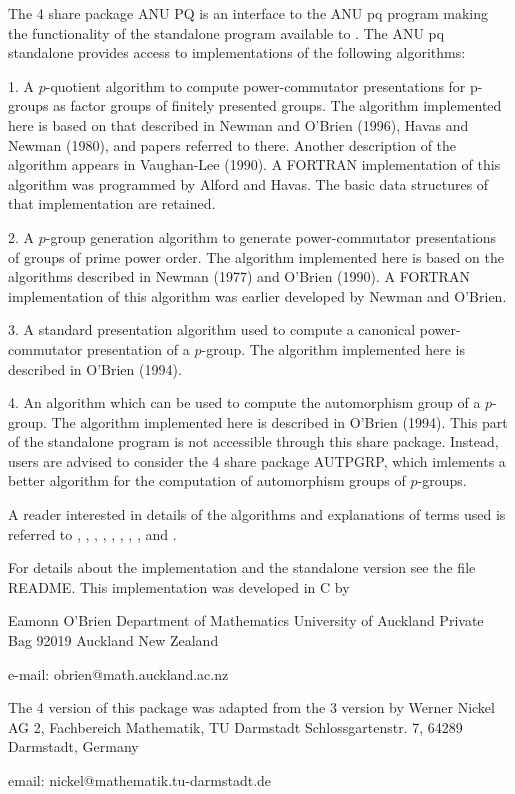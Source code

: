 
The {\GAP} 4 share  package ANU PQ is an interface to  the ANU pq program
making the  functionality of the standalone program  available to {\GAP}.
The ANU pq standalone provides access to implementations of the following
algorithms:

1.  A  $p$-quotient algorithm  to compute  power-commutator presentations
for  p-groups  as  factor  groups  of  finitely  presented  groups.   The
algorithm  implemented here  is based  on  that described  in Newman  and
O'Brien (1996),  Havas and Newman  (1980), and papers referred  to there.
Another description  of the algorithm  appears in Vaughan-Lee  (1990).  A
FORTRAN  implementation of this  algorithm was  programmed by  Alford and
Havas.  The basic data structures of that implementation are retained.

2. A   $p$-group  generation   algorithm  to   generate  power-commutator
presentations of groups of  prime power order.  The algorithm implemented
here is  based on the algorithms  described in Newman  (1977) and O'Brien
(1990).  A FORTRAN implementation of this algorithm was earlier developed
by Newman and O'Brien.

3.   A  standard presentation   algorithm  used  to compute  a  canonical
power-commutator presentation  of a $p$-group. The  algorithm implemented
here is described in O'Brien (1994).

4. An algorithm which can be used  to compute the automorphism group of a
$p$-group. The algorithm implemented here is described in O'Brien (1994).
This part of the standalone  program is not accessible through this share
package.   Instead, users  are advised  to  consider the  {\GAP} 4  share
package AUTPGRP,  which imlements a better algorithm  for the computation
of automorphism groups of $p$-groups.

A reader interested  in details  of the  algorithms  and explanations  of
terms  used  is  referred  to  \cite{NOBr96}, \cite{HN80},  \cite{OBr90},  
\cite{OBr94}, \cite{OBr95},    \cite{New77},    \cite{Vau84},     
\cite{Vau90a},  and \cite{Vau90b}.

For  details about  the implementation and the standalone version see the
file README. This implementation was developed in C by

\begintt
Eamonn O'Brien
Department of Mathematics
University of Auckland
Private Bag 92019
Auckland
New Zealand

e-mail: obrien@math.auckland.ac.nz 
\endtt

The {\GAP} 4 version of this package was adapted from the {\GAP} 3
version by  
\begintt
Werner Nickel
AG 2, Fachbereich Mathematik, TU Darmstadt
Schlossgartenstr. 7, 64289 Darmstadt, Germany

email: nickel@mathematik.tu-darmstadt.de
\endtt
